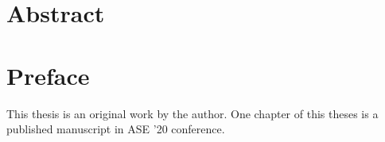 
\chapter{Abstract}


\chapter{Preface}

This thesis is an original work by the author. One chapter of this theses is a published manuscript in ASE '20 conference.

\dedication{To the ones who made this a smoother journey.} 

\tableofcontents


\listoftables


\listoffigures

